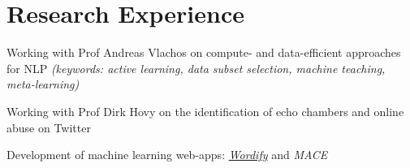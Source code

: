 \documentclass[]{deedy-resume-reversed}
\begin{document}
%
%

%
%

%
%

\begin{minipage}[t]{0.60\textwidth}



\section{Research Experience}

\vspace{\topsep}
\begin{tightemize}
\item Working with Prof Andreas Vlachos on compute- and data-efficient approaches for NLP \textit{(keywords: active learning, data subset selection, machine teaching, meta-learning)}
\end{tightemize}
\sectionsep

\begin{tightemize}
\item Working with Prof Dirk Hovy on the identification of echo chambers and online abuse on Twitter
\item Development of machine learning web-apps: \href{https://wordify.unibocconi.it/}{\it Wordify} and \textit{MACE}
\end{tightemize}
\sectionsep



\end{minipage}
\end{document}
